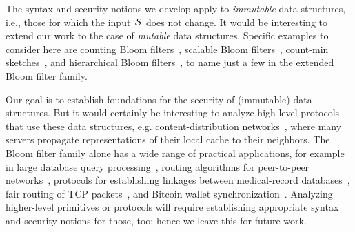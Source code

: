 %
The syntax and security notions we develop apply to \emph{immutable} data
structures, i.e., those for which the input~$\mathcal{S}$ does not change.
%
\fi
%
It would be interesting to extend our work to the case of \emph{mutable} data
structures. Specific examples to consider here are counting Bloom
filters~\cite{fan2000summary}, scalable Bloom
filters~\cite{almeida2007scalable}, count-min
sketches~\cite{cormode2005improved}, and hierarchical Bloom
filters~\cite{zhu2004hierarchical}, to name just a few in the extended Bloom
filter family.

Our goal is to establish foundations for the security of (immutable) data
structures. But it would certainly be interesting to analyze high-level
protocols that use these data structures, e.g.
content-distribution networks~\cite{byers2002informed}, where many servers
propagate representations of their local cache to their neighbors. The Bloom
filter family alone has a wide range of practical applications, for example in
large database query processing~\cite{broder2004network}, routing algorithms for
peer-to-peer networks~\cite{reynolds2003efficient}, protocols for establishing
linkages between medical-record databases~\cite{schnell2011novel}, fair routing
of TCP packets~\cite{feng2001stochastic}, and Bitcoin wallet
synchronization~\cite{gervais2014privacy}.
%
Analyzing higher-level primitives or protocols will require establishing
appropriate syntax and security notions for those, too; hence we leave this for
future work.


